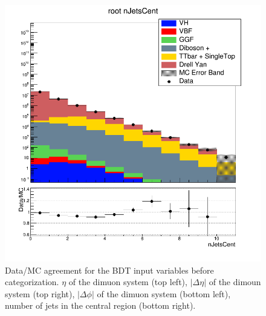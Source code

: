 \begin{figure}[htbp]
  \includegraphics[width=0.49\linewidth]{figures/bdt_cats/nJetsCent_root.png}
  \caption{Data/MC agreement for the BDT input variables before categorization. $\eta$ of the dimuon system (top left), $|\Delta \eta|$ of the dimoun system (top right), $|\Delta \phi|$ of the dimuon system (bottom left), number of jets in the central region (bottom right).}
  \label{fig:higgs_categorization_bdtinput1_inclusive}
\end{figure}


